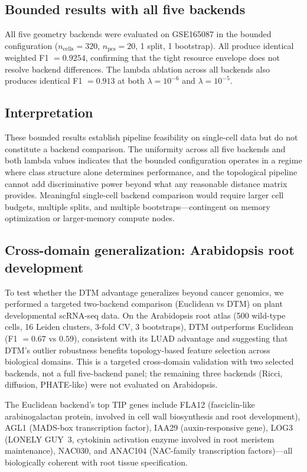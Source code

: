 \documentclass[11pt]{article}
\begin{document}
\subsection{Bounded results with all five backends}

All five geometry backends were evaluated on GSE165087 in the bounded configuration ($n_{\text{cells}} = 320$, $n_{\text{pcs}} = 20$, 1 split, 1 bootstrap).
All produce identical weighted F1 $= 0.9254$, confirming that the tight resource envelope does not resolve backend differences.
The lambda ablation across all backends also produces identical F1 $= 0.913$ at both $\lambda = 10^{-6}$ and $\lambda = 10^{-5}$.

\subsection{Interpretation}

These bounded results establish pipeline feasibility on single-cell data but do not constitute a backend comparison.
The uniformity across all five backends and both lambda values indicates that the bounded configuration operates in a regime where class structure alone determines performance, and the topological pipeline cannot add discriminative power beyond what any reasonable distance matrix provides.
Meaningful single-cell backend comparison would require larger cell budgets, multiple splits, and multiple bootstraps---contingent on memory optimization or larger-memory compute nodes.

\subsection{Cross-domain generalization: Arabidopsis root development}

To test whether the DTM advantage generalizes beyond cancer genomics, we performed a targeted two-backend comparison (Euclidean vs DTM) on plant developmental scRNA-seq data.
On the Arabidopsis root atlas (500 wild-type cells, 16 Leiden clusters, 3-fold CV, 3 bootstraps), DTM outperforms Euclidean (F1 $= 0.67$ vs $0.59$), consistent with its LUAD advantage and suggesting that DTM's outlier robustness benefits topology-based feature selection across biological domains.
This is a targeted cross-domain validation with two selected backends, not a full five-backend panel; the remaining three backends (Ricci, diffusion, PHATE-like) were not evaluated on Arabidopsis.

The Euclidean backend's top TIP genes include FLA12 (fasciclin-like arabinogalactan protein, involved in cell wall biosynthesis and root development), AGL1 (MADS-box transcription factor), IAA29 (auxin-responsive gene), LOG3 (LONELY GUY~3, cytokinin activation enzyme involved in root meristem maintenance), NAC030, and ANAC104 (NAC-family transcription factors)---all biologically coherent with root tissue specification.
\end{document}
